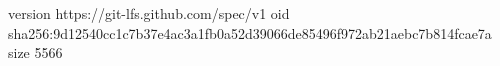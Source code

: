 version https://git-lfs.github.com/spec/v1
oid sha256:9d12540cc1c7b37e4ac3a1fb0a52d39066de85496f972ab21aebc7b814fcae7a
size 5566
